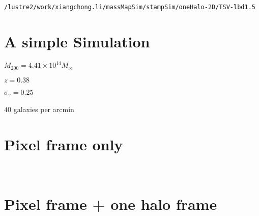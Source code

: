 \documentclass[11pt]{article}
\begin{document}
    \begin{Verbatim}[commandchars=\\\{\}]
/lustre2/work/xiangchong.li/massMapSim/stampSim/oneHalo-2D/TSV-lbd1.5
\end{Verbatim}

    \hypertarget{a-simple-simulation}{%
\section{A simple Simulation}\label{a-simple-simulation}}

\(M_{200}=4.41 \times 10^{14} M_{\odot}\)

\(z=0.38\)

\(\sigma_\gamma=0.25\)

\(40\) galaxies per arcmin

    \hypertarget{pixel-frame-only}{%
\section{Pixel frame only}\label{pixel-frame-only}}

    \begin{center}
    \end{center}
    { \hspace*{\fill} \\}
    
    \hypertarget{pixel-frame-one-halo-frame}{%
\section{Pixel frame + one halo
frame}\label{pixel-frame-one-halo-frame}}

    \begin{center}
    \end{center}
    { \hspace*{\fill} \\}
    

    
    
    
    
\end{document}
